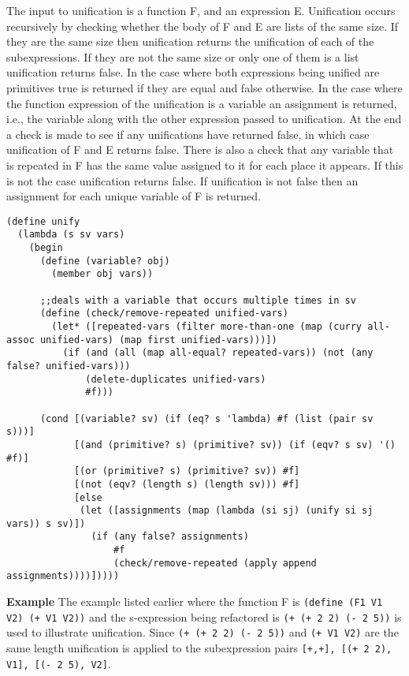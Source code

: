 \documentclass[a4paper,10pt]{article}
\begin{document}
The input to unification is a function F, and an expression E.  Unification occurs recursively by checking whether the body of F and E are lists of the same size.  If they are the same size then unification returns the unification of each of the subexpressions.  If they are not the same size or only one of them is a list unification returns false.  In the case where both expressions being unified are primitives true is returned if they are equal and false otherwise.  In the case where the function expression of the unification is a variable an assignment is returned, i.e., the variable along with the other expression passed to unification.  At the end a check is made to see if any unifications have returned false, in which case unification of F and E returns false.  There is also a check that any variable that is repeated in F has the same value assigned to it for each place it appears.  If this is not the case unification returns false. If unification is not false then an assignment for each unique variable of F is returned.

\begin{lstlisting}[frame=trBL]
(define unify
  (lambda (s sv vars)
    (begin
      (define (variable? obj)
        (member obj vars))

      ;;deals with a variable that occurs multiple times in sv
      (define (check/remove-repeated unified-vars)
        (let* ([repeated-vars (filter more-than-one (map (curry all-assoc unified-vars) (map first unified-vars)))])
          (if (and (all (map all-equal? repeated-vars)) (not (any false? unified-vars)))
              (delete-duplicates unified-vars)
              #f)))
      
      (cond [(variable? sv) (if (eq? s 'lambda) #f (list (pair sv s)))]
            [(and (primitive? s) (primitive? sv)) (if (eqv? s sv) '() #f)]
            [(or (primitive? s) (primitive? sv)) #f]
            [(not (eqv? (length s) (length sv))) #f]
            [else
             (let ([assignments (map (lambda (si sj) (unify si sj vars)) s sv)])
               (if (any false? assignments)
                   #f
                   (check/remove-repeated (apply append assignments))))]))))
\end{lstlisting}

{\bf Example}
The example listed earlier where the function F is \texttt{(define (F1 V1 V2) (+ V1 V2))} and the s-expression being refactored is \texttt{(+ (+ 2 2) (- 2 5))} is used to illustrate unification.  Since \texttt{(+ (+ 2 2) (- 2 5))} and \texttt{(+ V1 V2)} are the same length unification is applied to the subexpression pairs \texttt{[+,+], [(+ 2 2), V1], [(- 2 5), V2]}.
\end{document}
